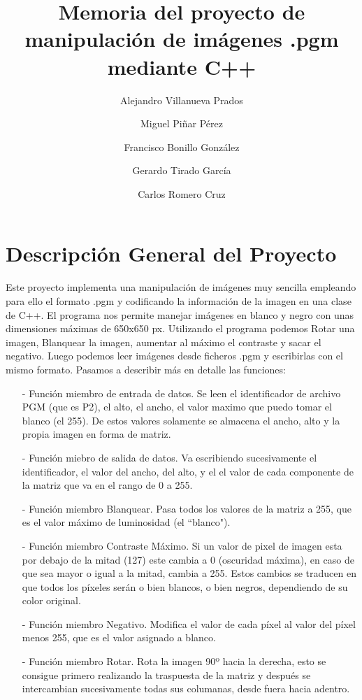 \documentclass[a4paper, 11pt, spanish]{article}
\title{Memoria del proyecto de manipulación de imágenes .pgm mediante C++}
\author{Alejandro Villanueva Prados \and Miguel Piñar Pérez \and Francisco Bonillo González \and Gerardo Tirado García \and Carlos Romero Cruz}
\date{}
\begin{document}
\maketitle

\tableofcontents

\newpage

\section{Descripción General del Proyecto}

Este proyecto implementa una manipulación de imágenes muy sencilla empleando para ello el formato .pgm y codificando la información de la imagen en una clase de C++. El programa nos permite manejar imágenes en blanco y negro con unas dimensiones máximas de 650x650 px. Utilizando el programa podemos Rotar una imagen, Blanquear la imagen, aumentar al máximo el contraste y sacar el negativo. Luego podemos leer imágenes desde ficheros .pgm y escribirlas con el mismo formato. Pasamos a describir más en detalle las funciones:

\begin{itemize}
\item[-] Función miembro de entrada de datos. Se leen el identificador de archivo PGM (que es P2), el alto, el ancho, el valor maximo que puedo tomar el blanco (el 255). De estos valores solamente se almacena el ancho, alto y la propia imagen en forma de matriz.

\item[-] Función miebro de salida de datos. Va escribiendo sucesivamente el identificador, el valor del ancho, del alto, y el el valor de cada componente de la matriz que va en el rango de 0 a 255.

\item[-] Función miembro Blanquear. Pasa todos los valores de la matriz a 255, que es el valor máximo de luminosidad (el ``blanco").

\item[-] Función miembro Contraste Máximo. Si un valor de pixel de imagen esta por debajo de la mitad (127) este cambia a 0 (oscuridad máxima), en caso de que sea mayor o igual a la mitad, cambia a 255. Estos cambios se traducen en que todos los píxeles serán o bien blancos, o bien negros, dependiendo de su color original.

\item[-] Función miembro Negativo. Modifica el valor de cada píxel al valor del píxel menos 255, que es el valor asignado a blanco.

\item[-] Función miembro Rotar. Rota la imagen 90º hacia la derecha, esto se consigue primero realizando la traspuesta de la matriz y después se intercambian sucesivamente todas sus columanas, desde fuera hacia adentro. 

\end{itemize}
\end{document}
